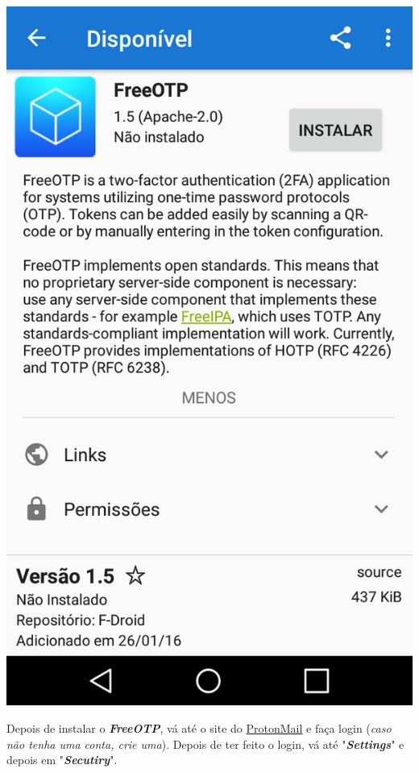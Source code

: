\documentclass[12pt, letterpaper, DejaVuSansMono:12]{report}
\begin{document}
	\begin{center}
		\includegraphics[scale=0.35]{FreeOTP-Fdroid.png}
	\end{center}

	Depois de instalar o \textit{\textbf{FreeOTP}}, vá até o site do \href{https://protonmail.com}{ProtonMail} e faça login (\textit{caso não tenha uma conta, crie uma}). Depois de ter feito o login, vá até "\textit{\textbf{Settings}}" e depois em "\textit{\textbf{Secutiry}}".
\end{document}
